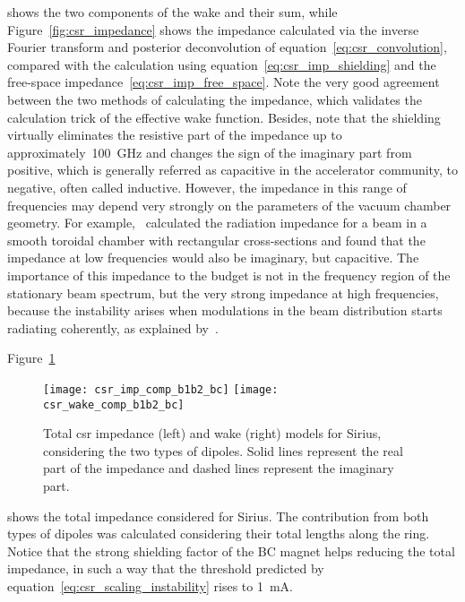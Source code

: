     shows the two components of the wake and their sum, while Figure~\ref{fig:csr_impedance} shows the impedance calculated via the inverse Fourier transform and posterior deconvolution of equation~\eqref{eq:csr_convolution}, compared with the calculation using equation~\eqref{eq:csr_imp_shielding} and the free-space impedance~\eqref{eq:csr_imp_free_space}. Note the very good agreement between the two methods of calculating the impedance, which validates the calculation trick of the effective wake function.
    Besides, note that the shielding virtually eliminates the resistive part of the impedance up to approximately~\SI{100}{\giga\hertz} and changes the sign of the imaginary part from positive, which is generally referred as capacitive in the accelerator community, to negative, often called inductive. However, the impedance in this range of frequencies may depend very strongly on the parameters of the vacuum chamber geometry. For example,~ calculated the radiation impedance for a beam in a smooth toroidal chamber with rectangular cross-sections and found that the impedance at low frequencies would also be imaginary, but capacitive. The importance of this impedance to the budget is not in the frequency region of the stationary beam spectrum, but the very strong impedance at high frequencies, because the instability arises when modulations in the beam distribution starts radiating coherently, as explained by~.

    Figure~\ref{fig:csr_total_impedance}
    \begin{figure}
        \centering
        \texttt{[image: csr\_imp\_comp\_b1b2\_bc]}\hfill
        \texttt{[image: csr\_wake\_comp\_b1b2\_bc]}
        \caption{Total \gls{csr} impedance (left) and wake (right) models for Sirius, considering the two types of dipoles. Solid lines represent the real part of the impedance and dashed lines represent the imaginary part.}
        \label{fig:csr_total_impedance}
    \end{figure}
    shows the total impedance considered for Sirius. The contribution from both types of dipoles was calculated considering their total lengths along the ring. Notice that the strong shielding factor of the BC magnet helps reducing the total impedance, in such a way that the threshold predicted by equation~\eqref{eq:csr_scaling_instability} rises to \SI{1}{\milli\ampere}.

